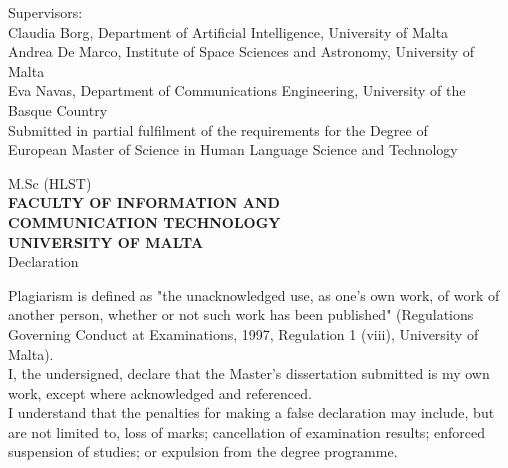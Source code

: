 \documentclass
[
    a4paper,
    twoside,
    12pt
]
{report}
\begin{document}
\begin{titlepage}
\begin{center}
       \vspace*{2.0cm}
	   Supervisors: \\
       Claudia Borg, Department of Artificial Intelligence, University of Malta \\
       Andrea De Marco, Institute of Space Sciences and Astronomy, University of Malta \\
       Eva Navas, Department of Communications Engineering, University of the Basque Country \\
       
       \vspace*{4.5cm}
       Submitted in partial fulfilment of the requirements for the Degree of \\
       European Master of Science in Human Language Science and Technology
    \end{center}



\end{titlepage}

\onehalfspacing
{}

\cleardoublepage

\begin{center}
  M.Sc (HLST) \\
  \uppercase{\textbf{Faculty of Information and \\
  Communication Technology \\ University of Malta \\ }}
  \vspace*{0.5cm}
  Declaration \\
\end{center}
  \vspace*{1.5cm}
        Plagiarism is defined as "the unacknowledged use, as one's own work, of work of another person, whether or not such work has been published" (Regulations Governing Conduct at Examinations, 1997, Regulation 1 (viii), University of Malta). \\

I, the undersigned, declare that the Master's dissertation submitted is my own work, except where acknowledged and referenced. \\

I understand that the penalties for making a false declaration may include, but are not limited to, loss of marks; cancellation of examination results; enforced suspension of studies; or expulsion from the degree programme. \\
       
\end{document}
